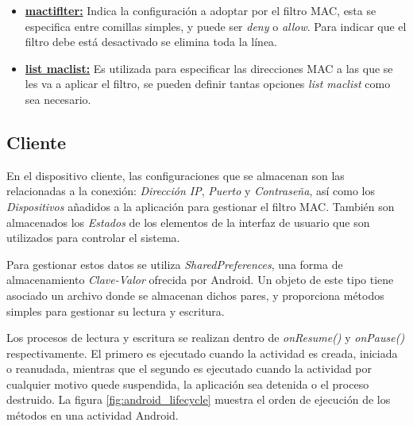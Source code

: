 \documentclass[12pt]{article}
\begin{document}
        \begin{itemize}
            \item \textbf{\underline{mactiflter:}} Indica la configuración a adoptar por el filtro MAC, esta se especifica entre comillas simples, y puede ser \textit{deny} o \textit{allow}. Para indicar que el filtro debe está desactivado se elimina toda la línea.
            \item \textbf{\underline{list maclist:}} Es utilizada para especificar las direcciones MAC a las que se les va a aplicar el filtro, se pueden definir tantas opciones \textit{list maclist} como sea necesario.
        \end{itemize}

    \subsection{Cliente}
        En el dispositivo cliente, las configuraciones que se almacenan son las relacionadas a la conexión: \textit{Dirección IP}, \textit{Puerto} y \textit{Contraseña}, así como los \textit{Dispositivos} añadidos a la aplicación para gestionar el filtro MAC. También son almacenados los \textit{Estados} de los elementos de la interfaz de usuario que son utilizados para controlar el sistema.

        Para gestionar estos datos se utiliza \textit{SharedPreferences}, una forma de almacenamiento \textit{Clave-Valor} ofrecida por Android. Un objeto de este tipo tiene asociado un archivo donde se almacenan dichos pares, y proporciona métodos simples para gestionar su lectura y escritura.
        
        Los procesos de lectura y escritura se realizan dentro de \textit{onResume()} y \textit{onPause()} respectivamente. El primero es ejecutado cuando la actividad es creada, iniciada o reanudada, mientras que el segundo es ejecutado cuando la actividad por cualquier motivo quede suspendida, la aplicación sea detenida o el proceso destruido. La figura \ref{fig:android_lifecycle} muestra el orden de ejecución de los métodos en una actividad Android.
        
\end{document}
